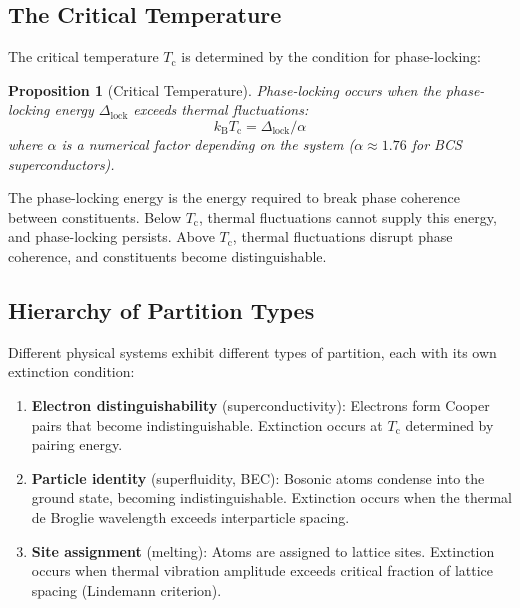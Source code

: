 \documentclass[twocolumn,10pt,aps,prd,superscriptaddress,nofootinbib]{revtex4-2}
\newtheorem{proposition}[theorem]{Proposition}
\theoremstyle{remark}
\newcommand{\kB}{k_{\mathrm{B}}}
\newcommand{\Tcrit}{T_{\mathrm{c}}}
\begin{document}
\subsection{The Critical Temperature}

The critical temperature $\Tcrit$ is determined by the condition for phase-locking:

\begin{proposition}[Critical Temperature]
\label{prop:critical_temperature}
Phase-locking occurs when the phase-locking energy $\Delta_{\text{lock}}$ exceeds thermal fluctuations:
\begin{equation}
\kB \Tcrit = \Delta_{\text{lock}} / \alpha
\label{eq:critical_temperature}
\end{equation}
where $\alpha$ is a numerical factor depending on the system ($\alpha \approx 1.76$ for BCS superconductors).
\end{proposition}

The phase-locking energy is the energy required to break phase coherence between constituents. Below $\Tcrit$, thermal fluctuations cannot supply this energy, and phase-locking persists. Above $\Tcrit$, thermal fluctuations disrupt phase coherence, and constituents become distinguishable.

\subsection{Hierarchy of Partition Types}

Different physical systems exhibit different types of partition, each with its own extinction condition:

\begin{enumerate}
\item \textbf{Electron distinguishability} (superconductivity): Electrons form Cooper pairs that become indistinguishable. Extinction occurs at $\Tcrit$ determined by pairing energy.

\item \textbf{Particle identity} (superfluidity, BEC): Bosonic atoms condense into the ground state, becoming indistinguishable. Extinction occurs when the thermal de Broglie wavelength exceeds interparticle spacing.

\item \textbf{Site assignment} (melting): Atoms are assigned to lattice sites. Extinction occurs when thermal vibration amplitude exceeds critical fraction of lattice spacing (Lindemann criterion).
\end{enumerate}
\end{document}
